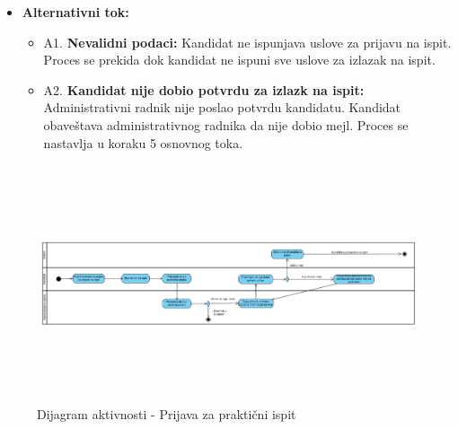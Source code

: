 \begin{itemize}
\item \textbf{Alternativni tok:}  
   \begin{itemize}
   \item A1. \textbf{Nevalidni podaci:}
  Kandidat ne ispunjava uslove za prijavu na ispit. Proces se prekida dok kandidat ne ispuni sve uslove za izlazak na ispit.
  \item A2. \textbf{Kandidat nije dobio potvrdu za izlazk na ispit:}
  Administrativni radnik nije poslao potvrdu kandidatu. Kandidat obaveštava administrativnog radnika da nije dobio mejl. Proces se nastavlja u koraku 5 osnovnog toka.
   \end{itemize}

\end{itemize}  

\begin{figure}[H]
  \begin{center}
      \includegraphics[width=140mm, height=70mm]{Diagrams/dijagram_aktivnosti_prijava_za_praktican_ispit.png}
  \end{center}
  \caption {Dijagram aktivnosti - Prijava za praktični ispit}
  \label{activity_prijava_za_prakticni_ispit}

\end{figure}
